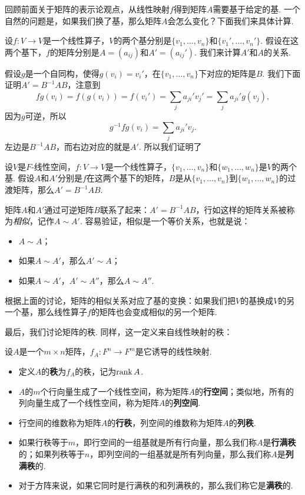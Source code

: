 回顾前面关于矩阵的表示论观点，从线性映射$f$得到矩阵$A$需要基于给定的基. 一个自然的问题是，如果我们换了基，那么矩阵$A$会怎么变化？下面我们来具体计算. 

设$f:V\to V$是一个线性算子，$V$的两个基分别是$\{v_1,\dots,v_n\}$和$\{v_1',\dots,v_n'\}$. 假设在这两个基下，$f$的矩阵分别是$A=(a_{ij})$和$A'=(a_{ij}')$. 我们来计算$A'$和$A$的关系. 

假设$g$是一个自同构，使得$g(v_i)=v_i'$，在$\{v_1,\dots,v_n\}$下对应的矩阵是$B$. 我们下面证明$A'=B^{-1}AB$，注意到
\[fg(v_i)=f(g(v_i))=f(v_i')=\sum_{j}a_{ji}'v_j'=\sum_{j}a_{ji}'g(v_j),\]
因为$g$可逆，所以
\[g^{-1}fg(v_i)=\sum_{j}a_{ji}'v_j.\]
左边是$B^{-1}AB$，而右边对应的就是$A'$. 所以我们证明了

\begin{theorem}\label{thm:base-change}
    设$V$是$F$-线性空间，$f:V\to V$是一个线性算子，$\{v_1,\dots,v_n\}$和$\{w_1,\dots,w_n\}$是$V$的两个基. 假设$A$和$A'$分别是$f$在这两个基下的矩阵，$B$是从$\{v_1,\dots,v_n\}$到$\{w_1,\dots,w_n\}$的过渡矩阵，那么$A'=B^{-1}AB$. 
\end{theorem}

矩阵$A$和$A'$通过可逆矩阵$B$联系了起来：$A'=B^{-1}AB$，行如这样的矩阵关系被称为\textit{相似}，记作$A\sim A'$. 容易验证，相似是一个等价关系，也就是说：
\begin{itemize}
    \item $A\sim A$；
    \item 如果$A\sim A'$，那么$A'\sim A$；
    \item 如果$A\sim A'$，$A'\sim A''$，那么$A\sim A''$.
\end{itemize}

根据上面的讨论，矩阵的相似关系对应了基的变换：如果我们把$V$的基换成$V$的另一个基，那么线性算子$f$的矩阵也会变成相似的另一个矩阵. 

最后，我们讨论矩阵的秩. 同样，这一定义来自线性映射的秩：

\begin{definition}
设$A$是一个$m\times n$矩阵，$f_A:F^n\to F^m$是它诱导的线性映射.
\begin{itemize}
    \item 定义$A$的\textbf{秩}为$f_A$的秩，记为$\operatorname*{rank} A$.
    \item $A$的$m$个行向量生成了一个线性空间，称为矩阵$A$的\textbf{行空间}；类似地，所有的列向量生成了一个线性空间，称为矩阵$A$的\textbf{列空间}.
    \item 行空间的维数称为矩阵$A$的\textbf{行秩}，列空间的维数称为矩阵$A$的\textbf{列秩}.
    \item 如果行秩等于$m$，即行空间的一组基就是所有行向量，那么我们称$A$是\textbf{行满秩}的；如果列秩等于$n$，即列空间的一组基就是所有列向量，那么我们称$A$是\textbf{列满秩}的.
    \item  对于方阵来说，如果它同时是行满秩的和列满秩的，那么我们称它是\textbf{满秩}的. 
\end{itemize}
\end{definition}

